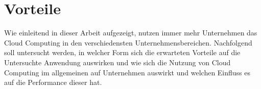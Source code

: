 \section{Vorteile}
Wie einleitend in dieser Arbeit aufgezeigt, nutzen immer mehr Unternehmen das Cloud Computing in den verschiedensten Unternehmensbereichen. Nachfolgend soll untersucht werden, in welcher Form sich die erwarteten Vorteile auf die Untersuchte Anwendung auswirken und wie sich die Nutzung von Cloud Computing im allgemeinen auf Unternehmen auswirkt und welchen Einfluss es auf die Performance dieser hat. \pagebreak